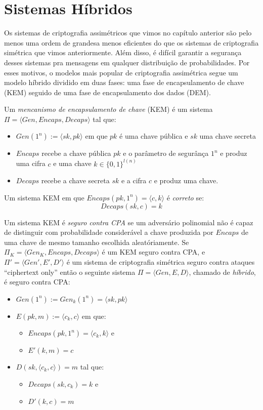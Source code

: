 \chapter{Sistemas Híbridos}
\label{cha:sistemas-hibridos}

Os sistemas de criptografia assimétricos que vimos no capítulo anterior são pelo menos uma ordem de grandesa menos eficientes do que os sistemas de criptografia simétrica que vimos anteriormente.
Além disso, é difícil garantir a segurança desses sistemas pra mensagens em qualquer distribuição de probabilidades.
Por esses motivos, o modelos mais popular de criptografia assimétrica segue um modelo híbrido dividido em duas fases: uma fase de encapsulamento de chave (KEM) seguido de uma fase de encapsulamento dos dados (DEM).

Um {\em mencanismo de encapsulamento de chave} (KEM) é um sistema $\Pi = \langle Gen, Encaps, Decaps \rangle$ tal que:
\begin{itemize}
\item $Gen(1^n) := \langle sk, pk \rangle$ em que $pk$ é uma chave pública e $sk$ uma chave secreta
\item $Encaps$ recebe a chave pública $pk$ e o parâmetro de segurânça $1^n$ e produz uma cifra $c$ e uma chave $k \in \{0,1\}^{l(n)}$
\item $Decaps$ recebe a chave secreta $sk$ e a cifra $c$ e produz uma chave.
\end{itemize}
 
Um sistema KEM em que $Encaps(pk, 1^n) = \langle c, k \rangle$ é {\em correto} se:
\begin{displaymath}
  Decaps(sk, c) =  k
\end{displaymath}

Um sistema KEM é {\em seguro contra CPA} se um adversário polinomial não é capaz de distinguir com probabilidade considerável a chave produzida por $Encaps$ de uma chave de mesmo tamanho escolhida aleatóriamente.
Se $\Pi_K = \langle Gen_K, Encaps, Decaps \rangle$ é um KEM seguro contra CPA, e $\Pi' = \langle Gen', E', D' \rangle$ é um sistema de criptografia simétrica seguro contra ataques ``ciphertext only'' então o seguinte sistema $\Pi = \langle Gen, E, D \rangle$, chamado de {\em híbrido}, é seguro contra CPA:

\begin{itemize}
\item $Gen(1^n) := Gen_k(1^n) = \langle sk, pk \rangle$
\item $E(pk, m) := \langle c_k, c \rangle$ em que: 
\begin{itemize}
\item $Encaps(pk, 1^n) = \langle c_k, k \rangle$ e
\item $E'(k, m) = c$
\end{itemize}
\item $D(sk,\langle c_k, c \rangle) = m$ tal que:
\begin{itemize}
\item $Decaps(sk, c_k) = k$ e
\item $D'(k, c) = m$
\end{itemize}
\end{itemize}

